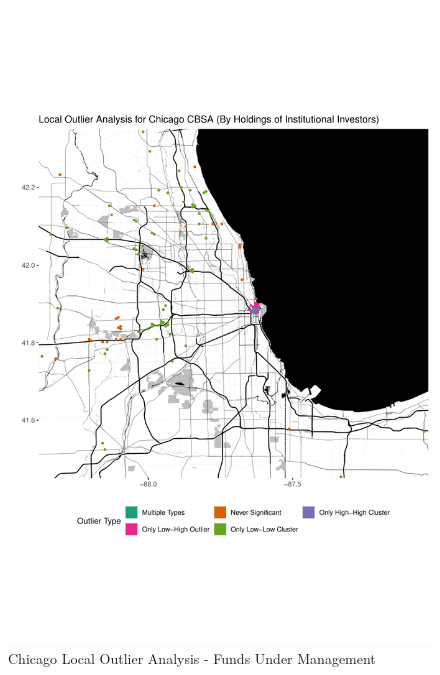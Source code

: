\begin{figure}
	\centering
	\includegraphics[width=1\linewidth]{Figures/ChapterIV/Chi_Money_LO}
	\caption[Chicago CBSA Local Outlier Analysis - Funds Under Management 2013-2018]{Chicago Local Outlier Analysis - Funds Under Management}
	\label{fig:Chicagolocaloutlier}
\end{figure}


